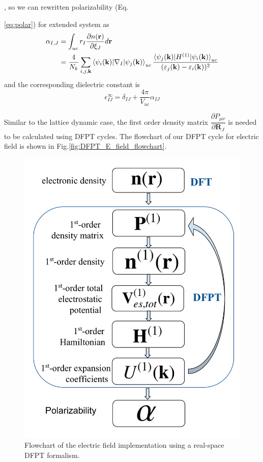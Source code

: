 , so we can rewritten polarizability (Eq.{\ref{eq:polar}) for extended system as
\begin{align}
\alpha_{I,J}& = \int_{uc}{r_I \dfrac{\partial n(\mathbf{r})}{\partial \xi_{J} }  d \mathbf{r}} \\
  & =\dfrac{4}{N_k} \sum_{i,j,\mathbf{k}}\braket{\psi_i(\mathbf{k})|\nabla_I|\psi_j(\mathbf{k})}_{uc} \dfrac{\braket{\psi_j(\mathbf{k})| H^{(1)}|\psi_i(\mathbf{k})}_{uc}}{(\varepsilon_j(\mathbf{k})-\varepsilon_i(\mathbf{k}))^2}
\end{align}
and the corresponding dielectric constant is 
\begin{equation}
\epsilon_{IJ}^{\infty}=\delta_{IJ} + \dfrac{4\pi}{V_{uc}} \alpha_{IJ}
\end{equation}

Similar to the lattice dynamic case, the first order density matrix $\dfrac{\partial  P_{\mu\nu}}{\partial {\mathbf{R}_{J} }}$ is needed to be calculated using DFPT cycles. The flowchart of our DFPT
cycle for electric field is shown in Fig.\ref{fig:DFPT_E_field_flowchart}.

\begin{figure}
\includegraphics[width=0.7\columnwidth]{DFPT_flowchart_E_filed}
\caption{Flowchart of the electric field implementation using a real-space DFPT formalism.}
\label{fig:DFPT_E_filed_flowchart}
\end{figure}


}
